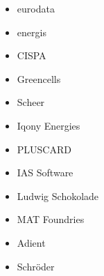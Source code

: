 \documentclass[12pt]{article}
\begin{document}
\begin{multicols}{4}
\begin{itemize}
	   		\item eurodata
	   		\item energis
	   		\item CISPA
	   		\item Greencells
	   		\item Scheer
	   		\item Iqony Energies
	   		\item PLUSCARD
	   		\item IAS Software
	   		\item Ludwig Schokolade
	   		\item MAT Foundries
	   		\item Adient
	   		\item Schröder
	\end{itemize}\end{multicols}
    
\end{document}
